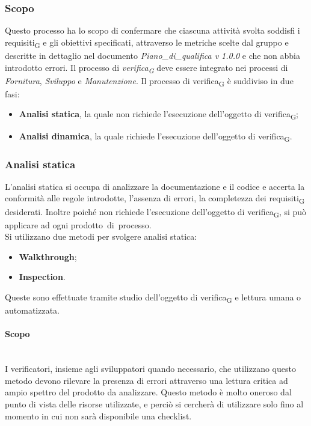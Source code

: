 \subsubsection{Scopo}
Questo processo ha lo scopo di confermare che ciascuna attività svolta soddisfi i requisiti\textsubscript{G} e gli obiettivi specificati, attraverso le metriche scelte dal gruppo e descritte in dettaglio nel documento \textit{Piano\_di\_qualifica v 1.0.0} e che non abbia introdotto errori.
Il processo di \textit{verifica\textsubscript{G}} deve essere integrato nei processi di \textit{Fornitura}, \textit{Sviluppo} e \textit{Manutenzione}.
\newline
\newline
Il processo di verifica\textsubscript{G} è suddiviso in due fasi:
\begin{itemize}
	\item \textbf{Analisi statica}, la quale non richiede l'esecuzione dell'oggetto di verifica\textsubscript{G};
	\item \textbf{Analisi dinamica}, la quale richiede l'esecuzione dell'oggetto di verifica\textsubscript{G}.
\end{itemize}

\subsubsection{Analisi statica}
L’analisi statica si occupa di analizzare la documentazione e il codice e accerta la conformità alle regole introdotte, l'assenza di errori, la completezza dei requisiti\textsubscript{G} desiderati. Inoltre poiché non richiede l’esecuzione dell’oggetto di verifica\textsubscript{G}, si può applicare ad ogni prodotto di processo.\\
Si utilizzano due metodi per svolgere analisi statica:
\begin{itemize}
	\item \textbf{Walkthrough};
	\item \textbf{Inspection}.
\end{itemize}
Queste sono effettuate tramite studio dell’oggetto di verifica\textsubscript{G} e lettura umana o automatizzata.
\paragraph {Scopo}\mbox{}\\
I verificatori, insieme agli sviluppatori quando necessario, che utilizzano questo metodo devono rilevare la presenza di errori attraverso una lettura critica ad ampio spettro del prodotto da analizzare. Questo metodo è molto oneroso dal punto di vista delle risorse utilizzate, e perciò si cercherà di utilizzare solo fino al momento in cui non sarà disponibile una checklist.
